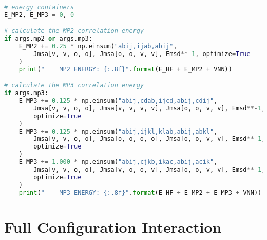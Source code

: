 \raggedbottom\begin{lstlisting}[language=Python, caption={\acrshort{mp2} and \acrshort{mp3} exercise code solution.}, label=code:mp_solution]
# energy containers
E_MP2, E_MP3 = 0, 0

# calculate the MP2 correlation energy
if args.mp2 or args.mp3:
    E_MP2 += 0.25 * np.einsum("abij,ijab,abij",
        Jmsa[v, v, o, o], Jmsa[o, o, v, v], Emsd**-1, optimize=True
    )
    print("    MP2 ENERGY: {:.8f}".format(E_HF + E_MP2 + VNN))

# calculate the MP3 correlation energy
if args.mp3:
    E_MP3 += 0.125 * np.einsum("abij,cdab,ijcd,abij,cdij",
        Jmsa[v, v, o, o], Jmsa[v, v, v, v], Jmsa[o, o, v, v], Emsd**-1, Emsd**-1,
        optimize=True
    )
    E_MP3 += 0.125 * np.einsum("abij,ijkl,klab,abij,abkl",
        Jmsa[v, v, o, o], Jmsa[o, o, o, o], Jmsa[o, o, v, v], Emsd**-1, Emsd**-1,
        optimize=True
    )
    E_MP3 += 1.000 * np.einsum("abij,cjkb,ikac,abij,acik",
        Jmsa[v, v, o, o], Jmsa[v, o, o, v], Jmsa[o, o, v, v], Emsd**-1, Emsd**-1,
        optimize=True
    )
    print("    MP3 ENERGY: {:.8f}".format(E_HF + E_MP2 + E_MP3 + VNN))
\end{lstlisting}

\section*{\texorpdfstring{Full Configuration Interaction\label{sec:ci_code_solution}}{Full Configuration Interaction}}

